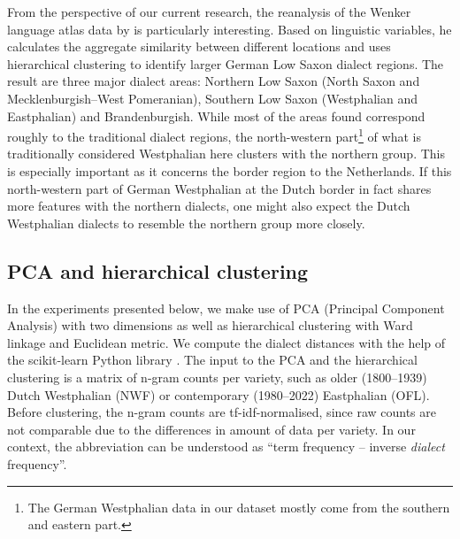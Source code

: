 \documentclass[output=paper,colorlinks,citecolor=brown]{langscibook}
\begin{document}


From the perspective of our current research, the reanalysis of the Wenker language atlas data by \citet{Lameli2016} is particularly interesting. Based on linguistic variables, he calculates the aggregate similarity between different locations and uses hierarchical clustering to identify larger German Low Saxon dialect regions. The result are three major dialect areas: Northern Low Saxon (North Saxon and Mecklenburgish--West Pomeranian), Southern Low Saxon (Westphalian and Eastphalian) and Brandenburgish. While most of the areas found correspond roughly to the traditional dialect regions, the north-western part\footnote{The German Westphalian data in our dataset mostly come from the southern and eastern part.} of what is traditionally considered Westphalian here clusters with the northern group. This is especially important as it concerns the border region to the Netherlands. If this north-western part of German Westphalian at the Dutch border in fact shares more features with the northern dialects, one might also expect the Dutch Westphalian dialects to resemble the northern group more closely. 

\subsection{PCA and hierarchical clustering}

In the experiments presented below, we make use of PCA (Principal Component Analysis) with two dimensions as well as hierarchical clustering with Ward linkage and Euclidean metric. We compute the dialect distances with the help of the scikit-learn Python library \citep{PedregosaEtAl2011}. The input to the PCA and the hierarchical clustering is a matrix of n-gram counts per variety, such as older (1800--1939) Dutch Westphalian (NWF) or contemporary (1980--2022) Eastphalian (OFL). Before clustering, the n-gram counts are tf-idf-normalised, since raw counts are not comparable due to the differences in amount of data per variety. In our context, the abbreviation can be understood as “term frequency -- inverse \textit{dialect} frequency”.
\end{document}
